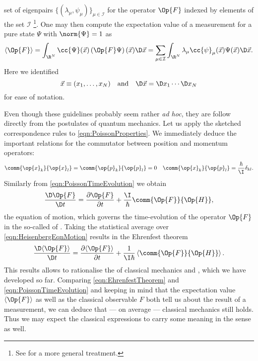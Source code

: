 \begin{enumerate}
		set of eigenpairs $\{ (\lambda_\mu, \psi_\mu) \}_{\mu \in \mathcal{I}}$
		for the operator $\Op{F}$
		indexed by elements of the set $\mathcal{I}$%
		\footnote{See \cite{Helffer2013} for a more general treatment.}.
		One may then compute the expectation value of a measurement
		for a pure state $\Psi$ with $\norm{\Psi} = 1$ as
		\begin{equation}
			\langle \Op{F} \rangle = \int_{\R^N} \cc{\Psi}(\vec{x}) \left(\Op{F} \Psi\right)(\vec{x}) \D \vec{x} = \sum_{\mu\in\mathcal{I}} \int_{\R^N} \lambda_\mu \cc{\psi}_\mu(\vec{x}) \Psi(\vec{x}) \D \vec{x}.
			\label{eqn:QMExpectation}
		\end{equation}
		Here we identified
		\[ \vec{x} \equiv (x_1, \ldots, x_N) \quad \text{and} \quad \D \vec{x} = \D x_1 \cdots \D x_N \]
		for ease of notation.
\end{enumerate}
Even though these guidelines probably seem rather \textit{ad hoc},
they are follow directly from the postulates of quantum mechanics.
Let us apply the sketched correspondence rules to \eqref{eqn:PoissonProperties}.
We immediately deduce the important relations for the commutator
between position and momentum operators:
\begin{align}
	\comm{\op{x}_k}{\op{x}_l} &= \comm{\op{p}_k}{\op{p}_l} = 0 & \comm{\op{x}_k}{\op{p}_l} = \frac{\hbar}{\I} \delta_{kl}.
	\label{eqn:compatibilityOperator}
\end{align}
Similarly from \eqref{eqn:PoissonTimeEvolution} we obtain
\begin{equation}
	\frac{\D \Op{F}}{\D t} = \frac{\partial \Op{F}}{\partial t} + \frac{\I}{\hbar} \comm{\Op{F}}{\Op{H}},
	\label{eqn:HeisenbergEqnMotion}
\end{equation}
the equation of motion, which governs the time-evolution of the operator $\Op{F}$
in the so-called  of \QM.
Taking the statistical average over \eqref{eqn:HeisenbergEqnMotion}
results in the Ehrenfest theorem
\begin{equation}
	\frac{\D \langle \Op{F} \rangle}{\D t} = \frac{\partial \langle \Op{F} \rangle}{\partial t} + \frac{1}{\I \hbar} \left\langle \comm{\Op{F}}{\Op{H}} \right\rangle.
	\label{eqn:EhrenfestTheorem}
\end{equation}
This results allows to rationalise the 
of classical mechanics and \QM,
which we have developed so far.
Comparing \eqref{eqn:EhrenfestTheorem} and \eqref{eqn:PoissonTimeEvolution}
and keeping in mind that the expectation value $\langle \Op{F} \rangle$
as well as the classical observable $F$ both tell us about the result
of a measurement,
we can deduce that --- on average --- classical mechanics still holds.
Thus we may expect the classical expressions to carry some meaning
in the \QM sense as well.

